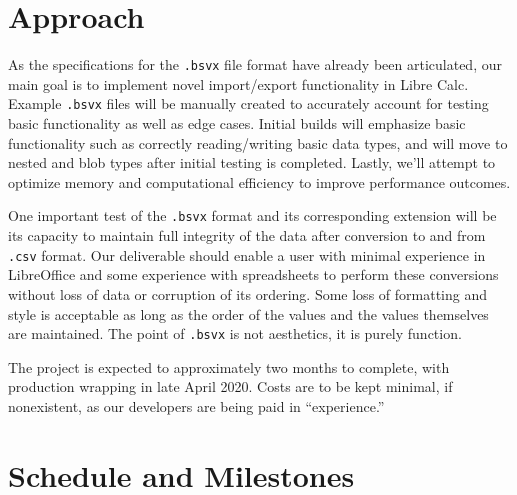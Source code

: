 \documentclass[10pt]{article}
\begin{document}
\section*{Approach}

As the specifications for the \texttt{.bsvx} file format have already been articulated, our main goal is to implement novel import/export functionality in Libre Calc.
Example \texttt{.bsvx} files will be manually created to accurately account for testing basic functionality as well as edge cases.
Initial builds will emphasize basic functionality such as correctly reading/writing basic data types, and will move to nested and blob types after initial testing is completed.
Lastly, we’ll attempt to optimize memory and computational efficiency to improve performance outcomes.

\indent{}
One important test of the \texttt{.bsvx} format and its corresponding extension will be its capacity to maintain full integrity of the data after conversion to and from \texttt{.csv} format.
Our deliverable should enable a user with minimal experience in LibreOffice and some experience with spreadsheets to perform these conversions without loss of data or corruption of its ordering.
Some loss of formatting and style is acceptable as long as the order of the values and the values themselves are maintained.
The point of \texttt{.bsvx} is not aesthetics, it is purely function.

\indent{}
The project is expected to approximately two months to complete, with production wrapping in late April 2020.
Costs are to be kept minimal, if nonexistent, as our developers are being paid in “experience.”

\section*{Schedule and Milestones}
\end{document}
